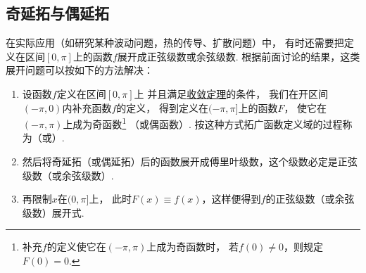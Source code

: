 \subsection{奇延拓与偶延拓}
在实际应用（如研究某种波动问题，热的传导、扩散问题）中，
有时还需要把定义在区间\([0,\pi]\)上的函数\(f\)展开成正弦级数或余弦级数.
根据前面讨论的结果，这类展开问题可以按如下的方法解决：
\begin{enumerate}
\item 设函数\(f\)定义在区间\([0,\pi]\)上%
并且满足\hyperref[theorem:无穷级数.傅里叶级数收敛的狄利克雷充分条件]{收敛定理}的条件，
我们在开区间\((-\pi,0)\)内补充函数\(f\)的定义，
得到定义在\((-\pi,\pi]\)上的函数\(F\)，
使它在\((-\pi,\pi)\)上成为奇函数\footnote{%
补充\(f\)的定义使它在\((-\pi,\pi)\)上成为奇函数时，
若\(f(0)\neq0\)，则规定\(F(0)=0\).}%
（或偶函数）.
按这种方式拓广函数定义域的过程称为（或）.

\item 然后将奇延拓（或偶延拓）后的函数展开成傅里叶级数，这个级数必定是正弦级数（或余弦级数）.

\item 再限制\(x\)在\((0,\pi]\)上，
此时\(F(x)\equiv f(x)\)，这样便得到\(f\)的正弦级数（或余弦级数）展开式.
\end{enumerate}

